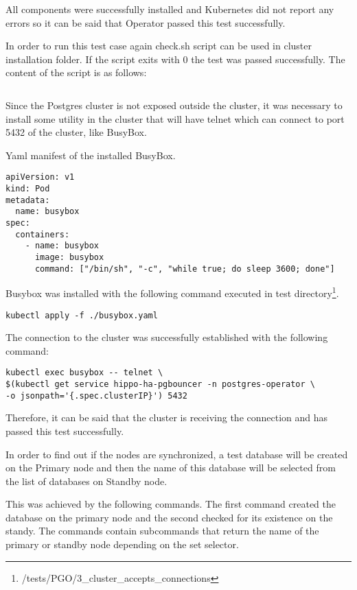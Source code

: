 All components were successfully installed and Kubernetes did not report any errors so it can be said that Operator passed this test successfully.

In order to run this test case again check.sh script can be used in cluster installation folder. If the script exits with 0 the test was passed successfully. The content of the script is as follows:
\begin{verbatim}

\end{verbatim}

Since the Postgres cluster is not exposed outside the cluster, it was necessary to install some utility in the cluster that will have telnet which can connect to port 5432 of the cluster, like BusyBox.

Yaml manifest of the installed BusyBox.
\begin{verbatim}
apiVersion: v1
kind: Pod
metadata:
  name: busybox
spec:
  containers:
    - name: busybox
      image: busybox
      command: ["/bin/sh", "-c", "while true; do sleep 3600; done"]
\end{verbatim}

Busybox was installed with the following command executed in test directory\footnote{/tests/PGO/3\_cluster\_accepts\_connections}.
\begin{verbatim}
kubectl apply -f ./busybox.yaml
\end{verbatim}

The connection to the cluster was successfully established with the following command:

\begin{verbatim}
kubectl exec busybox -- telnet \
$(kubectl get service hippo-ha-pgbouncer -n postgres-operator \
-o jsonpath='{.spec.clusterIP}') 5432
\end{verbatim}

Therefore, it can be said that the cluster is receiving the connection and has passed this test successfully.

\n{3}{Cluster synchronization}
\label{chap:pgosync}
In order to find out if the nodes are synchronized, a test database will be created on the Primary node and then the name of this database will be selected from the list of databases on Standby node.

This was achieved by the following commands. The first command created the database on the primary node and the second checked for its existence on the standy. The commands contain subcommands that return the name of the primary or standby node depending on the set selector.

